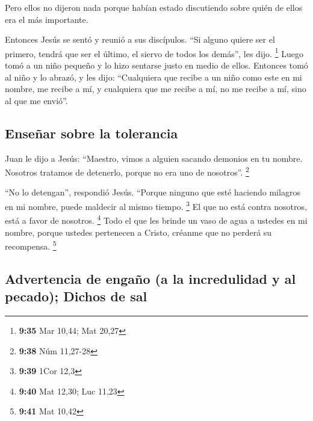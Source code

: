  Pero ellos no dijeron nada porque habían estado
discutiendo sobre quién de ellos era el más importante.

 Entonces Jesús se sentó y reunió a sus discípulos. ``Si
alguno quiere ser el primero, tendrá que ser el último, el siervo de
todos los demás'', les dijo. \footnote{\textbf{9:35} Mar 10,44; Mat
  20,27}  Luego tomó a un niño pequeño y lo hizo sentarse
justo en medio de ellos. Entonces tomó al niño y lo abrazó, y les dijo:
 ``Cualquiera que recibe a un niño como este en mi
nombre, me recibe a mí, y cualquiera que me recibe a mí, no me recibe a
mí, sino al que me envió''.

\hypertarget{enseuxf1ar-sobre-la-tolerancia}{%
\subsection{Enseñar sobre la
tolerancia}\label{enseuxf1ar-sobre-la-tolerancia}}

 Juan le dijo a Jesús: ``Maestro, vimos a alguien sacando
demonios en tu nombre. Nosotros tratamos de detenerlo, porque no era uno
de nosotros''. \footnote{\textbf{9:38} Núm 11,27-28}

 ``No lo detengan'', respondió Jesús. ``Porque ninguno
que esté haciendo milagros en mi nombre, puede maldecir al mismo tiempo.
\footnote{\textbf{9:39} 1Cor 12,3}  El que no está contra
nosotros, está a favor de nosotros. \footnote{\textbf{9:40} Mat 12,30;
  Luc 11,23}  Todo el que les brinde un vaso de agua a
ustedes en mi nombre, porque ustedes pertenecen a Cristo, créanme que no
perderá su recompensa. \footnote{\textbf{9:41} Mat 10,42}

\hypertarget{advertencia-de-engauxf1o-a-la-incredulidad-y-al-pecado-dichos-de-sal}{%
\subsection{Advertencia de engaño (a la incredulidad y al pecado);
Dichos de
sal}\label{advertencia-de-engauxf1o-a-la-incredulidad-y-al-pecado-dichos-de-sal}}

